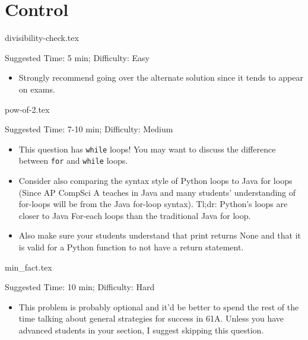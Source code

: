 \documentclass{exam}
\begin{document}
\section{Control}
\begin{questions}
    {divisibility-check.tex}
    \begin{questionmeta}
        Suggested Time: 5 min; Difficulty: Easy
        \begin{itemize}
            \item Strongly recommend going over the alternate solution since it tends to appear on exams.
        \end{itemize}
    \end{questionmeta}

    {pow-of-2.tex}
    \begin{questionmeta}
        Suggested Time: 7-10 min; Difficulty: Medium
        \begin{itemize}
            \item This question has \lstinline{while} loops! You may want to discuss the difference between \lstinline{for} and \lstinline{while} loops. 
            \item Consider also comparing the syntax style of Python loops to Java for loops (Since AP CompSci A teaches in Java and many students' understanding of for-loops will be from the Java for-loop syntax). Tl;dr: Python's loops are closer to Java For-each loops than the traditional Java for loop.
            \item Also make sure your students understand that print returns None and that it is valid for a Python function to not have a return statement.
        \end{itemize}
    \end{questionmeta}

    {min_fact.tex}
    \begin{questionmeta}
        Suggested Time: 10 min; Difficulty: Hard
        \begin{itemize}
            \item This problem is probably optional and it'd be better to spend the rest of the time talking about general strategies for success in 61A. Unless you have advanced students in your section, I suggest skipping this question.
        \end{itemize}
    \end{questionmeta}
\end{questions}
\end{document}
